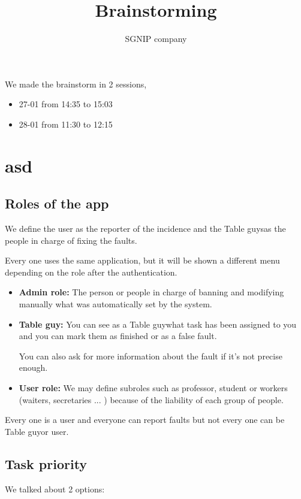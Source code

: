 \documentclass[nobuilddate,nochap]{apuntes}
\title{Brainstorming}
\author{SGNIP company}
\newcommand{\tbg}{Table guy}
\newcommand{\tbgs}{Table guys}
\begin{document}
\maketitle
\newpage

We made the brainstorm in 2 sessions, 

\begin{itemize}
\item 27-01 from 14:35 to 15:03
\item 28-01 from 11:30 to 12:15
\end{itemize}

\section{asd}

\subsection{Roles of the app}
We define the user as the reporter of the incidence and the \tbgs as the people in charge of fixing the faults.


Every one uses the same application, but it will be shown a different menu depending on the role after the authentication.

\begin{itemize}
\item \textbf{Admin role: } The person or people in charge of banning and modifying manually what was automatically set by the system.

\item\textbf{\tbg:} You can see as a \tbg what task has been assigned to you and you can mark them as finished or as a false fault. 

You can also ask for more information about the fault if it's not precise enough.

\item \textbf{User role: }  We may define subroles such as professor, student or workers (waiters, secretaries ... ) because of the liability of each group of people.

\end{itemize}

Every one is a user and everyone can report faults but not  every one can be \tbg or user.

\subsection{Task priority}
We talked about 2 options:
\end{document}
